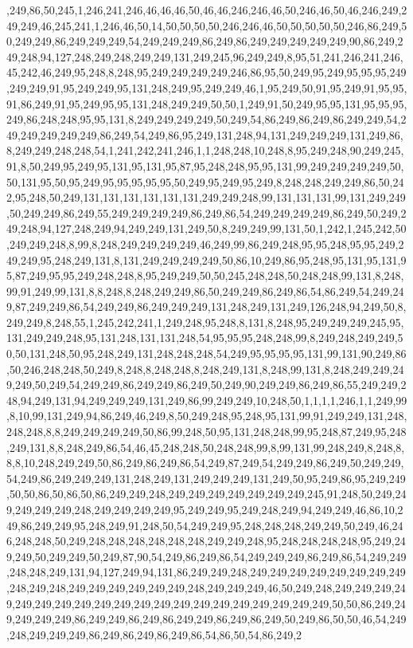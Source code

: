 ,249,86,50,245,1,246,241,246,46,46,46,50,46,46,246,246,46,50,246,46,50,46,246,249,249,249,46,245,241,1,246,46,50,14,50,50,50,50,246,246,46,50,50,50,50,50,246,86,249,50,249,249,86,249,249,249,54,249,249,249,86,249,86,249,249,249,249,249,90,86,249,249,248,94,127,248,249,248,249,249,131,249,245,96,249,249,8,95,51,241,246,241,246,45,242,46,249,95,248,8,248,95,249,249,249,249,246,86,95,50,249,95,249,95,95,95,249,249,249,91,95,249,249,95,131,248,249,95,249,249,46,1,95,249,50,91,95,249,91,95,95,91,86,249,91,95,249,95,95,131,248,249,249,50,50,1,249,91,50,249,95,95,131,95,95,95,249,86,248,248,95,95,131,8,249,249,249,249,50,249,54,86,249,86,249,86,249,249,54,249,249,249,249,249,86,249,54,249,86,95,249,131,248,94,131,249,249,249,131,249,86,8,249,249,248,248,54,1,241,242,241,246,1,1,248,248,10,248,8,95,249,248,90,249,245,91,8,50,249,95,249,95,131,95,131,95,87,95,248,248,95,95,131,99,249,249,249,249,50,50,131,95,50,95,249,95,95,95,95,95,50,249,95,249,95,249,8,248,248,249,249,86,50,242,95,248,50,249,131,131,131,131,131,131,249,249,248,99,131,131,131,99,131,249,249,50,249,249,86,249,55,249,249,249,249,86,249,86,54,249,249,249,249,86,249,50,249,249,248,94,127,248,249,94,249,249,131,249,50,8,249,249,99,131,50,1,242,1,245,242,50,249,249,248,8,99,8,248,249,249,249,249,46,249,99,86,249,248,95,95,248,95,95,249,249,249,95,248,249,131,8,131,249,249,249,249,50,86,10,249,86,95,248,95,131,95,131,95,87,249,95,95,249,248,248,8,95,249,249,50,50,245,248,248,50,248,248,99,131,8,248,99,91,249,99,131,8,8,248,8,248,249,249,86,50,249,249,86,249,86,54,86,249,54,249,249,87,249,249,86,54,249,249,86,249,249,249,131,248,249,131,249,126,248,94,249,50,8,249,249,8,248,55,1,245,242,241,1,249,248,95,248,8,131,8,248,95,249,249,249,245,95,131,249,249,248,95,131,248,131,131,248,54,95,95,95,248,248,99,8,249,248,249,249,50,50,131,248,50,95,248,249,131,248,248,248,54,249,95,95,95,95,131,99,131,90,249,86,50,246,248,248,50,249,8,248,8,248,248,8,248,249,131,8,248,99,131,8,248,249,249,249,249,50,249,54,249,249,86,249,249,86,249,50,249,90,249,249,86,249,86,55,249,249,248,94,249,131,94,249,249,249,131,249,86,99,249,249,10,248,50,1,1,1,1,246,1,1,249,99,8,10,99,131,249,94,86,249,46,249,8,50,249,248,95,248,95,131,99,91,249,249,131,248,248,248,8,8,249,249,249,249,50,86,99,248,50,95,131,248,248,99,95,248,87,249,95,248,249,131,8,8,248,249,86,54,46,45,248,248,50,248,248,99,8,99,131,99,248,249,8,248,8,8,8,10,248,249,249,50,86,249,86,249,86,54,249,87,249,54,249,249,86,249,50,249,249,54,249,86,249,249,249,131,248,249,131,249,249,249,131,249,50,95,249,86,95,249,249,50,50,86,50,86,50,86,249,249,248,249,249,249,249,249,249,249,245,91,248,50,249,249,249,249,249,248,249,249,249,249,95,249,249,95,249,248,249,94,249,249,46,86,10,249,86,249,249,95,248,249,91,248,50,54,249,249,95,248,248,248,249,249,50,249,46,246,248,248,50,249,248,248,248,248,248,248,249,249,248,95,248,248,248,248,95,249,249,249,50,249,249,50,249,87,90,54,249,86,249,86,54,249,249,249,86,249,86,54,249,249,248,248,249,131,94,127,249,94,131,86,249,249,248,249,249,249,249,249,249,249,249,248,249,248,249,249,249,249,249,249,248,249,249,249,46,50,249,248,249,249,249,249,249,249,249,249,249,249,249,249,249,249,249,249,249,249,249,249,50,50,86,249,249,249,249,249,86,249,249,86,249,86,249,249,86,249,86,249,50,249,86,50,50,46,54,249,248,249,249,249,86,249,86,249,86,249,86,54,86,50,54,86,249,2